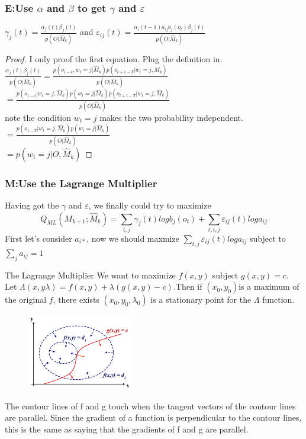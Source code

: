 \documentclass{beamer}
\begin{document}
\begin{frame}
\frametitle{E:Use $\alpha$ and $\beta$ to get $\gamma$ and $\varepsilon$ }
\begin{theorem}
$\gamma_j(t)= \frac{\alpha_j(t) \beta_j(t)}{p(O|\hat{M}_k)}$ and 
$\varepsilon_{ij}(t) = \frac{\alpha_i(t-1) a_{ij} b_j(o_t) \beta_j(t)}{p(O|\hat{M}_k)}$
\end{theorem}
\begin{proof}
I only proof the first equation. Plug the definition in.\\
$\frac{\alpha_j(t) \beta_j(t)}{p(O|\hat{M}_k)} = 
\frac{p(o_{1-t}, w_t=j|\hat{M}_k)p(o_{t+1-T}|w_t=j, \hat{M}_k)}{p(O|\hat{M}_k)}$ \\
$= \frac{p(o_{1-t}|w_t=j, \hat{M}_k)p(w_t=j|\hat{M}_k)p(o_{t+1-T}|w_t=j, \hat{M}_k)}{p(O|\hat{M}_k)}$ \\
note the condition $w_t=j$ makes the two probability independent.
$=\frac{p(o_{1-T}|w_t=j,\hat{M}_k)p(w_t=j|\hat{M}_k)}{p(O|\hat{M}_k)}$ \\
$=p(w_t=j|O,\hat{M}_k)$
\end{proof}
\end{frame}

\begin{frame}
\frametitle{M:Use the Lagrange Multiplier}
Having got the $\gamma$ and $\varepsilon$, we finally could try to maximize 
\begin{equation}
Q_{ML}(M_{k+1};\hat{M}_{k}) = \sum_{t,j} \gamma_j(t)logb_j(o_t)+\sum_{t,i,j}\varepsilon_{ij}(t)loga_{ij}
\end{equation}
First let's consider $a_{i*}$, now we should maxmize $\sum_{t,j} \varepsilon_{ij}(t)loga_{ij}$ subject to $\sum_j a_{ij} = 1$
\end{frame}
\begin{block}{The Lagrange Multiplier}
We want to maximize $f(x,y)$ subject $g(x,y) = c$.\\
Let $\Lambda(x, y \lambda) = f(x,y) + \lambda (g(x,y)-c)$.Then if $(x_0, y_0)$is a maximum of the original $f$, there exists $(x_0,y_0,\lambda_0)$ is a stationary point for the $\Lambda$ function.\\
\begin{figure}[L]
\includegraphics[width=130pt]{Lagrange.png}
\end{figure}
The contour lines of f and g touch when the tangent vectors of the contour lines are parallel. Since the gradient of a function is perpendicular to the contour lines, this is the same as saying that the gradients of f and g are parallel. 
\end{block}
\end{document}
